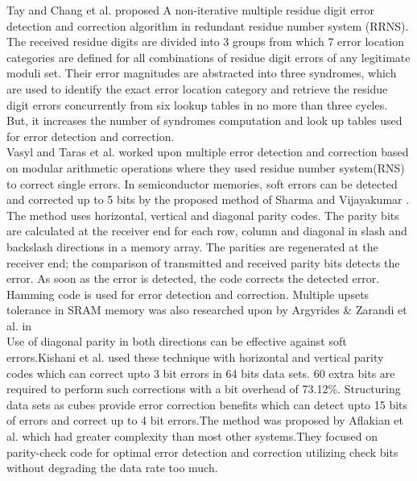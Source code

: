 \documentclass[12pt,a4paper]{report}
\begin{document}
Tay and Chang et al. \cite{TayChang} proposed A non-iterative multiple residue digit error detection and correction algorithm in redundant residue number system (RRNS). The received residue digits are divided into 3 groups from which 7 error location categories are defined for all combinations of residue digit errors of any legitimate moduli set. Their error magnitudes are abstracted into three syndromes, which are used to identify the exact error location category and retrieve the residue digit errors concurrently from six lookup tables in no more than three cycles. But, it increases the number of syndromes computation and look up tables used for error detection and correction.\\

Vasyl and Taras et al. \cite{YatskivTsavolyk} worked upon multiple error detection and correction based on modular arithmetic operations where they used residue number system(RNS) to correct single errors.
In semiconductor memories, soft errors can be detected and corrected up to 5 bits by the proposed method of Sharma and Vijayakumar \cite{VijayakumarSharma}. The method uses horizontal, vertical and diagonal parity codes. The parity bits are calculated at the receiver end for each row, column and diagonal in slash and backslash directions in a memory array. The parities are regenerated at the receiver end; the comparison of transmitted and received parity bits detects the error. As soon as the error is detected, the code corrects the detected error. Hamming code is used for error detection and correction. Multiple upsets tolerance in SRAM memory was also researched upon by Argyrides \& Zarandi et al. in \cite{ArgyridesHRDK}\\ 

Use of diagonal parity in both directions can be effective against soft errors.Kishani et al. \cite{KishaniZarandiPedram} used these technique with horizontal and vertical parity codes which can correct upto 3 bit errors in 64 bits data sets. 60 extra bits are required to perform such corrections with a bit overhead of 73.12\%.
Structuring data sets as cubes provide error correction benefits which can detect upto 15 bits of errors and correct up to 4 bit errors.The method was proposed by Aflakian et al. \cite{AflakianSiddiquiKhan} which had greater complexity than most other systems.They focused on parity-check code for optimal error detection and correction utilizing check bits without degrading the data rate too much.\\
\end{document}

